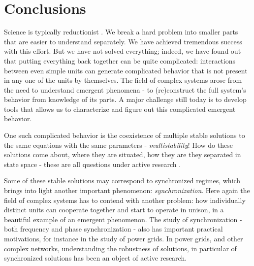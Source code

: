 \chapter{Conclusions}\label{chap:conclusions}

Science is typically reductionist \cite{strogatzsyncbook}. We break a hard problem into smaller parts that are easier to understand separately. We have achieved tremendous success with this effort. But we have not solved everything; indeed, we have found out that putting everything back together can be quite complicated: interactions between even simple units can generate complicated behavior that is not present in any one of the units by themselves.
The field of complex systems arose from the need to understand emergent phenomena - to (re)construct the full system's behavior from knowledge of its parts. A major challenge still today is to develop tools that allows us to characterize and figure out this complicated emergent behavior.

One such complicated behavior is the coexistence of multiple stable solutions to the same equations with the same parameters - \textit{multistability}! How do these solutions come about, where they are situated, how they are they separated in state space - these are all questions under active research \cite{feudel2008complex, pisarchik2022multistability, zhang2021basins}. 

Some of these stable solutions may correspond to synchronized regimes, which brings into light another important phenomenon: \textit{synchronization}. Here again the field of complex systems has to contend with another problem: how individually distinct units can cooperate together and start to operate in unison, in a beautiful example of an emergent phenomenon. The study of synchronization - both frequency and phase synchronization - also has important practical motivations, for instance in the study of power grids. In power grids, and other complex networks, understanding the robustness of solutions, in particular of synchronized solutions has been an object of active research. 


